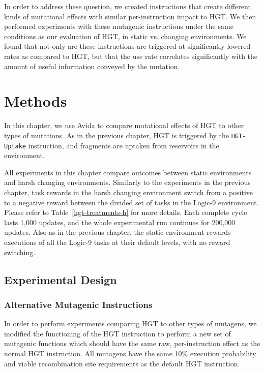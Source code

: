 \documentclass[PhD]{msu-thesis}
\begin{document}
In order to address these question, we created instructions that create different kinds of mutational effects with similar per-instruction impact to HGT. We then performed experiments with these mutagenic instructions under the same conditions as our evaluation of HGT, in static vs. changing environments. We found that not only are these instructions are triggered at significantly lowered rates as compared to HGT, but that the use rate correlates significantly with the amount of useful information conveyed by the mutation. 


\section{Methods}
In this chapter, we use Avida to compare mutational effects of HGT to other types of mutations. As in the previous chapter, HGT is triggered by the \texttt{HGT-Uptake} instruction, and fragments are uptaken from reservoirs in the environment. 

All experiments in this chapter compare outcomes between static environments and harsh changing environments. Similarly to the experiments in the previous chapter, task rewards in the harsh changing environment switch from a positive to a negative reward between the divided set of tasks in the Logic-9 environment. Please refer to Table~\ref{hgt-treatments-h} for more details. Each complete cycle lasts 1,000 updates, and the whole experimental run continues for 200,000 updates.
Also as in the previous chapter, the static environment rewards executions of all the Logic-9 tasks at their default levels, with no reward switching.

\subsection{Experimental Design}

\subsubsection{Alternative Mutagenic Instructions}
In order to perform experiments comparing HGT to other types of mutagens, we modified the functioning of the HGT instruction to perform a new set of mutagenic functions which should have the same raw, per-instruction effect as the normal HGT instruction. All mutagens have the same 10\% execution probability and viable recombination site requirements as the default HGT instruction.
\end{document}
